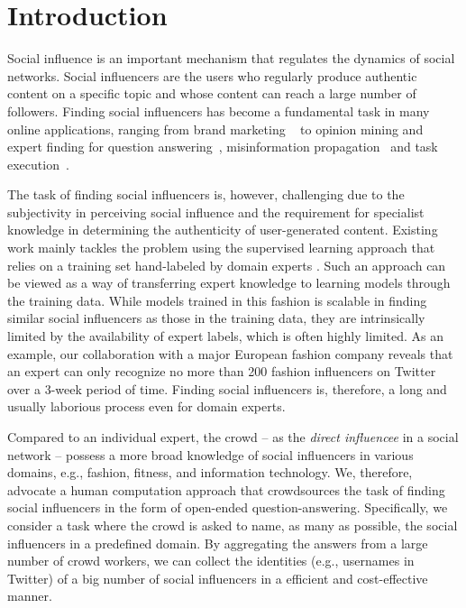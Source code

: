 \section{Introduction}

Social influence is an important mechanism that regulates the dynamics of social networks. Social influencers are the users who regularly produce authentic content on a specific topic and whose content can reach a large number of followers. Finding social influencers has become a fundamental task in many online applications, ranging from brand marketing
~\cite{bond201261,richardson2002mining,van2007new} to opinion mining \cite{pang2008opinion,li2012mining} and expert finding for question 
answering~\cite{riahi2012finding}, misinformation propagation~\cite{DBLP:conf/icde/SongHL17} and task execution~\cite{sun2014analyzing,miao2010generative}. 

The task of finding social influencers is, however, challenging due to the subjectivity in perceiving social influence and the requirement for specialist knowledge in determining the authenticity of user-generated content. Existing work mainly tackles the problem using the supervised learning approach that relies on a training set hand-labeled by domain experts \cite{Cheng2014,Lehmann2013,wei2016learning}. Such an approach can be viewed as a way of transferring expert knowledge to learning models through the training data. While models trained in this fashion is scalable in finding similar social influencers as those in the training data, they are intrinsically limited by the availability of expert labels, which is often highly limited. As an example, our collaboration with a major European fashion company reveals that an expert can only recognize no more than 200 fashion influencers on Twitter over a 3-week period of time. Finding social influencers is, therefore, a long and usually laborious process even for domain experts.

Compared to an individual expert, the crowd -- as the \emph{direct influencee} in a social network -- possess a more broad knowledge of social influencers in various domains, e.g., fashion, fitness, and information technology. We, therefore, advocate a human computation approach that crowdsources the task of finding social influencers in the form of open-ended question-answering. Specifically, we consider a task where the crowd is asked to name, as many as possible, the social influencers in a predefined domain. By aggregating the answers from a large number of crowd workers, we can collect the identities (e.g., usernames in Twitter) of a big number of social influencers in a efficient and cost-effective manner. 

